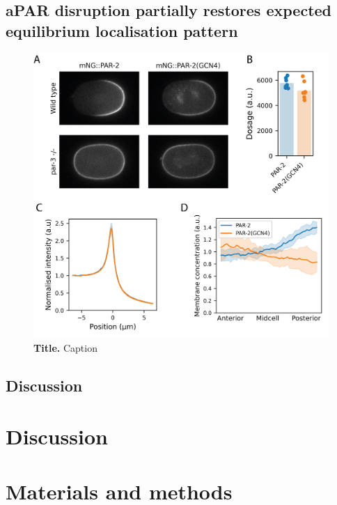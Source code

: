 \documentclass[12pt]{"report"}
\newcommand{\mycaption}[2]{\caption[#1]{\textbf{#1.} #2}}
\begin{document}
\section{aPAR disruption partially restores expected equilibrium localisation pattern}

\begin{figure}[!h]
\includegraphics[scale=0.95]{gcn4_par3mut}
\setlength{\abovecaptionskip}{20pt}
\centering
\mycaption{Title}{Caption}
\label{fig:gcn4_par3mut}
\end{figure}

\section{Discussion}



\clearpage
\chapter{Discussion}


\clearpage
\chapter{Materials and methods}
\end{document}
